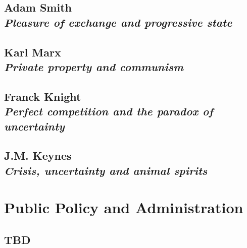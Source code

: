 \documentclass[dvipsnames,12pt]{book}
\begin{document}
        

    \chapter[Pleasure of exchange and progressive state]{Adam Smith \\[0.6cm] \textit{Pleasure of exchange and progressive state}}

        

    \chapter[Private property and communism]{Karl Marx \\[0.6cm] \textit{Private property and communism}}

    \chapter[Perfect competition and paradox of uncertainty]{Franck Knight\\[0.6cm] \textit{Perfect competition and the paradox of uncertainty}}

    \chapter[Crisis, uncertainty and animal spirits]{J.M. Keynes \\[0.6cm] \textit{Crisis, uncertainty and animal spirits}}

\part{Public Policy and Administration}

    \chapter{TBD}
\end{document}
